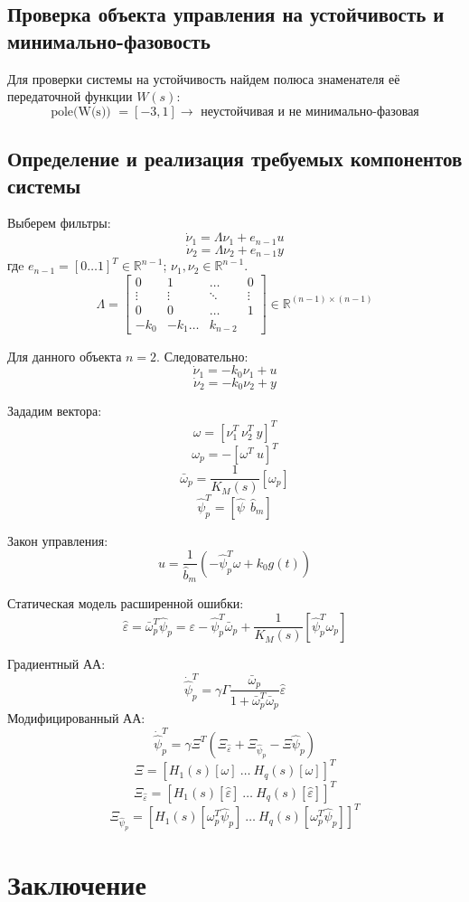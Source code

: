 \documentclass{article}
\begin{document}
\subsection{Проверка объекта управления на устойчивость и минимально-фазовость}
Для проверки системы на устойчивость найдем полюса знаменателя её передаточной функции \(W(s)\):
\[\text{pole(W(s)) } = [-3, 1] \rightarrow \text{ неустойчивая и не минимально-фазовая}\]

\subsection{Определение и реализация требуемых компонентов системы}
Выберем фильтры:
\[\dot \nu_1 = \Lambda \nu_1 + e_{n-1}u\]
\[\dot \nu_2 = \Lambda \nu_2 + e_{n-1}y\]
гдe \(e_{n-1} = [0 \hdots 1]^T \in \mathds{R}^{n-1}\); \(\nu_1, \nu_2 \in \mathds{R}^{n-1}\).
\[\Lambda = \begin{bmatrix}
  0 & 1 & \hdots & 0 \\
  \vdots & \vdots & \ddots & \vdots \\
  0 & 0 & \hdots & 1 \\
  -k_0 & -k_1 \hdots & k_{n- 2}
\end{bmatrix} \in \mathds{R}^{(n-1) \times (n-1)} \]

Для данного объекта \(n=2\). Следовательно:
\[\dot \nu_1 = -k_0 \nu_1 + u\]
\[\dot \nu_2 = -k_0 \nu_2 + y\]

Зададим вектора:
\[\omega = [\nu_1^T~\nu_2^T~y]^T\]
\[\omega_p = -[\omega^T~u]^T\]
\[\bar \omega_p = \frac{1}{K_M(s)}[\omega_p]\]
\[\hat{\psi}_p^T = [\hat \psi ~~ \hat b_m] \]

Закон управления:
\[u = \frac{1}{\hat{b}_m}(-\hat{\psi}_p^T \omega + k_0 g(t)) \]

Статическая модель расширенной ошибки:
\[\hat \varepsilon = \bar \omega_p^T \hat{\psi}_p =  \varepsilon - \hat{\psi}_p^T \bar \omega_p + \frac{1}{K_M(s)}[ \hat{\psi}_p^T \omega_p]\]

Градиентный АА:
\[\dot {\hat{\psi}}_p^T = \gamma \Gamma \frac{\bar \omega_p}{1 + \bar \omega_p^T \bar \omega_p} \hat \varepsilon\]
Модифицированный АА:
\[\dot {\hat{\psi}}_p^T = \gamma \Xi^T (\Xi_{\hat \varepsilon }+ \Xi_{\hat{\psi}_p} - \Xi \hat{\psi}_p)\]
\[\Xi = [H_1(s)[\omega]~\dots~H_q(s)[\omega]]^T\]
\[\Xi_{\hat \varepsilon } = [H_1(s)[\hat \varepsilon]~\dots~H_q(s)[\hat \varepsilon]]^T\]
\[\Xi_{\hat{\psi}_p}  = [H_1(s)[\omega_p^T \hat{\psi}_p ]~\dots~H_q(s)[\omega_p^T \hat{\psi}_p ]]^T\]

\FloatBarrier



\newpage
\section{Заключение}
\end{document}

